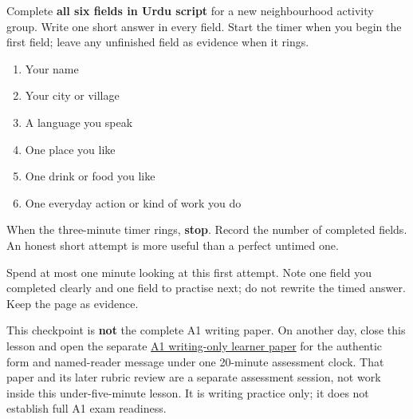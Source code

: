 Complete \textbf{all six fields in Urdu script} for a new neighbourhood activity group. Write one short answer in every field. Start the timer when you begin the first field; leave any unfinished field as evidence when it rings.

\begin{enumerate}
\raggedright
  \item Your name
  \item Your city or village
  \item A language you speak
  \item One place you like
  \item One drink or food you like
  \item One everyday action or kind of work you do
\end{enumerate}

When the three-minute timer rings, \textbf{stop}. Record the number of completed fields. An honest short attempt is more useful than a perfect untimed one.

\begin{tcolorbox}[breakable,colback=teal!4,colframe=teal!35!black,title={Before you move on}]
Spend at most one minute looking at this first attempt. Note one field you completed clearly and one field to practise next; do not rewrite the timed answer. Keep the page as evidence.

This checkpoint is \textbf{not} the complete A1 writing paper. On another day, close this lesson and open the separate \href{https://github.com/adhithyan15/coding-adventures/blob/main/code/learning/human-languages/urdu/mocks/a1/writing-paper-1.md}{A1 writing-only learner paper} for the authentic form and named-reader message under one 20-minute assessment clock. That paper and its later rubric review are a separate assessment session, not work inside this under-five-minute lesson. It is writing practice only; it does not establish full A1 exam readiness.
\end{tcolorbox}
